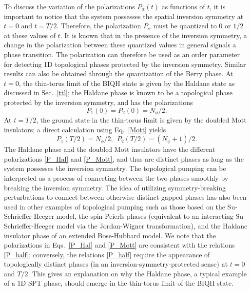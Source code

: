 \documentclass[aps,prb,twocolumn,superscriptaddress,showpacs,floatfix]{revtex4-1}
\begin{document}
To discuss the variation of the polarizations $P_\alpha (t)$ as functions of $t$, 
it is important to notice that the system possesses the spatial inversion symmetry at $t=0$ and $t=T/2$. Therefore, the polarization $P_\alpha$ must be quantized to $0$ or $1/2$ at these values of $t$. 
It is known that in the presence of the inversion symmetry, a change in the polarization between these quantized values in general signals a phase transition.\cite{NakamuraTodo,NakamuraVoit} 
The polarization can therefore be used as an order parameter for detecting 1D topological phases protected by the inversion symmetry.\cite{NakamuraTodo,NakamuraVoit,Qi, Hughes} 
Similar results can also be obtained through the quantization of the Berry phase.\cite{Zak, Hatsugai, Hirano,  Kariyado1, Kariyado2} 
At $t=0$, the thin-torus limit of the BIQH state is given by the Haldane state as discussed in Sec.\ \ref{ttl};  
the Haldane phase is known to be a topological phase protected by the inversion symmetry,\cite{GuWen, Pollmann1, Pollmann2} and has the polarizations\cite{NakamuraTodo,NakamuraVoit} 
\begin{equation}\label{P_Hal}
 P_1(0)=P_2(0)=N_\phi/2.
\end{equation}
At $t=T/2$, the ground state in the thin-torus limit is given by the doubled Mott insulators;  a direct calculation using Eq.\ \eqref{Mott} yields 
\begin{equation}\label{P_Mott}
 P_1(T/2)=N_\phi/2,~~P_2(T/2)=(N_\phi+1)/2.
\end{equation} 
The Haldane phase and the doubled Mott insulators have the different polarizations \eqref{P_Hal} and \eqref{P_Mott}, and thus are distinct phases as long as the system possesses the inversion symmetry. The topological pumping can be interpreted as a process of connecting between the two phases smoothly by breaking the inversion symmetry. 
The idea of utilizing symmetry-breaking perturbations to connect between otherwise distinct gapped phases has also been used in other examples of topological pumping such as those based on the Su-Schrieffer-Heeger model,\cite{RiceMele, NiuReview, SSH} the spin-Peierls phases\cite{Shindou} (equivalent to an interacting Su-Schrieffer-Heeger model via the Jordan-Wigner transformation), and the Haldane insulator phase of an extended Bose-Hubbard model.\cite{BergLevinAltman} 
We note that the polarizations in Eqs.\ \eqref{P_Hal} and \eqref{P_Mott} are consistent with the relations \eqref{P_half}; conversely, the relations \eqref{P_half} require the appearance of topologically distinct phases (in an inversion-symmetry-protected sense) at $t=0$ and $T/2$. 
This gives an explanation on why the Haldane phase, a typical example of a 1D SPT phase, should emerge in the thin-torus limit of the BIQH state. 
\end{document}
